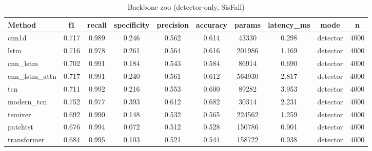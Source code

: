 \begin{table}[t]
\centering
\caption{Backbone zoo (detector-only, SisFall)}
\begin{tabular}{lccccccccc}
\toprule
Method & f1 & recall & specificity & precision & accuracy & params & latency_ms & mode & n \\
\midrule
cnn1d & 0.717 & 0.989 & 0.246 & 0.562 & 0.614 & 43330 & 0.298 & detector & 4000 \\
lstm & 0.716 & 0.978 & 0.261 & 0.564 & 0.616 & 201986 & 1.169 & detector & 4000 \\
cnn_lstm & 0.702 & 0.991 & 0.184 & 0.543 & 0.584 & 86914 & 0.690 & detector & 4000 \\
cnn_lstm_attn & 0.717 & 0.991 & 0.240 & 0.561 & 0.612 & 564930 & 2.817 & detector & 4000 \\
tcn & 0.711 & 0.992 & 0.216 & 0.553 & 0.600 & 89282 & 3.953 & detector & 4000 \\
modern_tcn & 0.752 & 0.977 & 0.393 & 0.612 & 0.682 & 30314 & 2.231 & detector & 4000 \\
tsmixer & 0.692 & 0.990 & 0.148 & 0.532 & 0.565 & 224562 & 1.259 & detector & 4000 \\
patchtst & 0.676 & 0.994 & 0.072 & 0.512 & 0.528 & 150786 & 0.901 & detector & 4000 \\
transformer & 0.684 & 0.995 & 0.103 & 0.521 & 0.544 & 158722 & 0.938 & detector & 4000 \\
\bottomrule
\end{tabular}
\end{table}